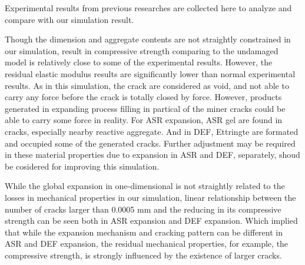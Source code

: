 Experimental results from previous researches are collected here to analyze and compare with our simulation result.

Though the dimension and aggregate contents are not straightly constrained in our simulation, result in compressive strength comparing to the undamaged model is relatively close to some of the experimental results. However, the residual elastic modulus results are significantly lower than normal experimental results. As in this simulation, the crack are considered as void, and not able to carry any force before the crack is totally closed by force. However, products generated in expanding process filling in partical of the miner cracks could be able to carry some force in reality. For ASR expansion, ASR gel are found in cracks, especially nearby reactive aggregate. And in DEF, Ettringte are formated and occupied some of the generated cracks. Further adjustment may be required in these material properties due to expansion in ASR and DEF, separately, shoud be cosidered for improving this simulation.

While the global expansion in one-dimensional is not straightly related to the losses in mechanical properties in our simulation, linear relationship between the number of cracks larger than 0.0005 mm and the reducing in its compressive strength can be seen both in ASR expansion and DEF expansion. Which implied that while the expansion mechanism and cracking pattern can be different in ASR and DEF expansion, the residual mechanical properties, for example, the compressive strength, is strongly influenced by the existence of larger cracks.
